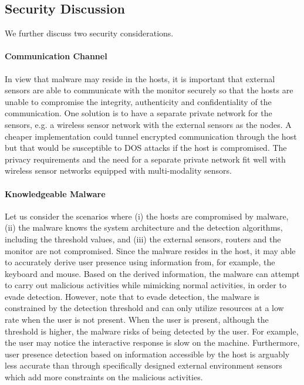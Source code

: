 %

\subsection{Security Discussion}

We further discuss two security considerations.

\paragraph{Communication Channel}

In view that malware may reside in the hosts,
it is important that external sensors are able to communicate with
the monitor securely so that the hosts are unable to compromise
the integrity, authenticity and confidentiality of the communication.
One solution is to have a separate private network for the sensors,
e.g. a wireless sensor network with the external sensors as the nodes.
A cheaper implementation could tunnel encrypted communication
through the host but that would be susceptible to DOS attacks if
the host is compromised.
The privacy requirements and the need for a separate private
network fit well with wireless sensor networks equipped with
multi-modality sensors.

\paragraph{Knowledgeable Malware}

Let us consider the scenarios where
(i) the hosts are compromised by malware,
(ii) the malware knows the system architecture and the detection algorithms,
including the threshold values, and
(iii) the external sensors, routers and the monitor are not compromised.
Since the malware resides in the host, it may able
to accurately derive user presence using information from, for example,
the keyboard and mouse.
Based on the derived information, the malware can attempt
to carry out malicious activities while mimicking normal activities, in order
to evade detection.
However, note that to evade detection, the malware is
constrained by the detection threshold and can only utilize resources at a low
rate when the user is not present.
When the user is present, although the threshold is
higher, the malware risks of being detected by the user.
For example, the
user may notice the interactive response is slow on the machine.
Furthermore, user presence detection based on information accessible 
by the host is arguably less accurate than through specifically 
designed external environment
sensors which add more constraints on the malicious activities.
